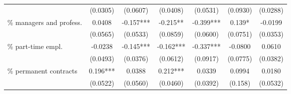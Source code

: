 \begin{threeparttable}
\begin{tabular}{l*{6}{S}}
                          &  (0.0305)  & (0.0607)   & (0.0408)   & (0.0531)   & (0.0930)  & (0.0288)    \\[1ex]
\% managers and profess.  &  0.0408    & -0.157***  & -0.215**   & -0.399***  & 0.139*    & -0.0199     \\
                          &  (0.0565)  & (0.0533)   & (0.0859)   & (0.0600)   & (0.0751)  & (0.0353)    \\[1ex]
\% part-time empl.        &  -0.0238   & -0.145***  & -0.162***  & -0.337***  & -0.0800   & 0.0610      \\
                          &  (0.0493)  & (0.0376)   & (0.0612)   & (0.0917)   & (0.0775)  & (0.0382)    \\[1ex]
\% permanent contracts    &  0.196***  & 0.0388     & 0.212***   & 0.0339     & 0.0994    & 0.0180      \\
                          &  (0.0522)  & (0.0560)   & (0.0460)   & (0.0392)   & (0.158)   & (0.0532)    \\[1ex]


\end{tabular}
\end{threeparttable}
